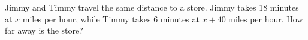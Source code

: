 Jimmy and Timmy travel the same distance to a store. Jimmy takes 18 minutes at $x$ miles per hour, while Timmy takes 6 minutes at $x+40$ miles per hour. How far away is the store?
